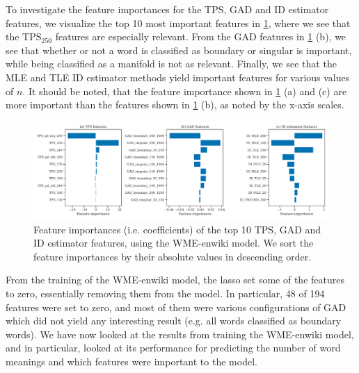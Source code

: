 To investigate the feature importances for the TPS, GAD and ID estimator features, we visualize the top 10 most important features in \cref{fig:wme-enwiki-feature-importances-tps-gad-estimated-ids}, where we see that the $\text{TPS}_{250}$ features are especially relevant. From the GAD features in \cref{fig:wme-enwiki-feature-importances-tps-gad-estimated-ids} (b), we see that whether or not a word is classified as boundary or singular is important, while being classified as a manifold is not as relevant. Finally, we see that the MLE and TLE ID estimator methods yield important features for various values of $n$. It should be noted, that the feature importance shown in \cref{fig:wme-enwiki-feature-importances-tps-gad-estimated-ids} (a) and (c) are more important than the features shown in \cref{fig:wme-enwiki-feature-importances-tps-gad-estimated-ids} (b), as noted by the x-axis scales.
\begin{figure}[H]
    \centering
    \includegraphics[width=\textwidth]{thesis/figures/wme-enwiki-top-10-feature-importances-tps-gad-estimated-ids.pdf}
    \caption{Feature importances (i.e. coefficients) of the top 10 TPS, GAD and ID estimator features, using the WME-enwiki model. We sort the feature importances by their absolute values in descending order.}
    \label{fig:wme-enwiki-feature-importances-tps-gad-estimated-ids}
\end{figure}

From the training of the WME-enwiki model, the lasso set some of the features to zero, essentially removing them from the model. In particular, 48 of 194 features were set to zero, and most of them were various configurations of GAD which did not yield any interesting result (e.g. all words classified as boundary words). We have now looked at the results from training the WME-enwiki model, and in particular, looked at its performance for predicting the number of word meanings and which features were important to the model.

